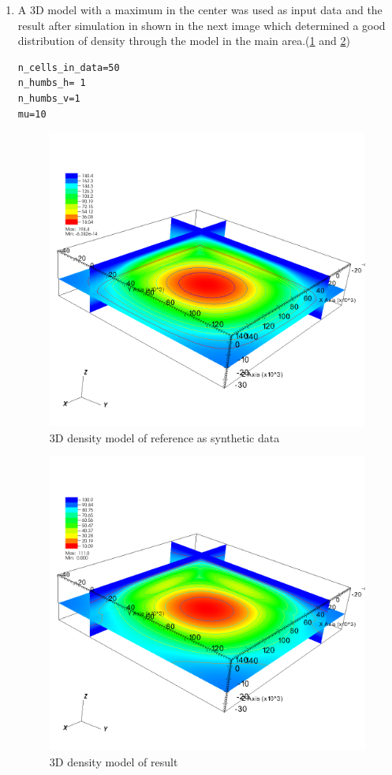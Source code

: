 \begin{enumerate}
\item A 3D model with a maximum in the center was used as input data and the result after simulation in shown in the next image which determined a good distribution of density through the model in the main area.(\ref{fig:gravity3D} and \ref{fig:gravity3D1})

\begin{verbatim}
n_cells_in_data=50
n_humbs_h= 1
n_humbs_v=1
mu=10
\end{verbatim}

\begin{figure}
\centering
\includegraphics[width=\textwidth]{density3D-ref.png}
\caption{3D density model of reference as synthetic data}
\label{fig:gravity3D}
\end{figure}

\begin{figure}
\centering
\includegraphics[width=\textwidth]{gravity3D.png}
\caption{3D density model of result}
\label{fig:gravity3D1}
\end{figure}
\end{enumerate}
